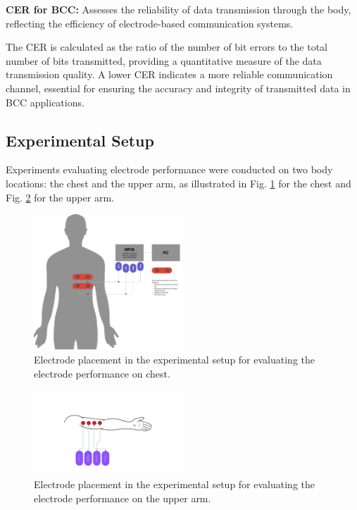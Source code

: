 \documentclass[conference]{IEEEtran}
\begin{document}
\textbf{\gls{CER}  for \gls{BCC}:} Assesses the reliability of data transmission through the body, reflecting the efficiency of electrode-based communication systems.
    
    The \gls{CER} is calculated as the ratio of the number of bit errors to the total number of bits transmitted, providing a quantitative measure of the data transmission quality. A lower \gls{CER} indicates a more reliable communication channel, essential for ensuring the accuracy and integrity of transmitted data in \gls{BCC} applications.
    


\subsection{Experimental Setup}
Experiments evaluating electrode performance were conducted on two body locations: the chest and the upper arm, as illustrated in Fig. \ref{fig:experimental_setup} for the chest and Fig. \ref{fig:experimental_setup_upper_arm} for the upper arm.
\begin{figure}[!ht]
    \centering
    \includegraphics[width=0.5\textwidth]{figures/experimentSetup.png}
    \caption{Electrode placement in the experimental setup for evaluating the electrode performance on chest.}
    \label{fig:experimental_setup}
\end{figure}

\begin{figure}
    \centering
    \includegraphics[width=0.5\textwidth]{figures/experimentSetup_upper_arm.jpeg}
    \caption{Electrode placement in the experimental setup for evaluating the electrode performance on the upper arm.}
    \label{fig:experimental_setup_upper_arm}
\end{figure}
\end{document}
